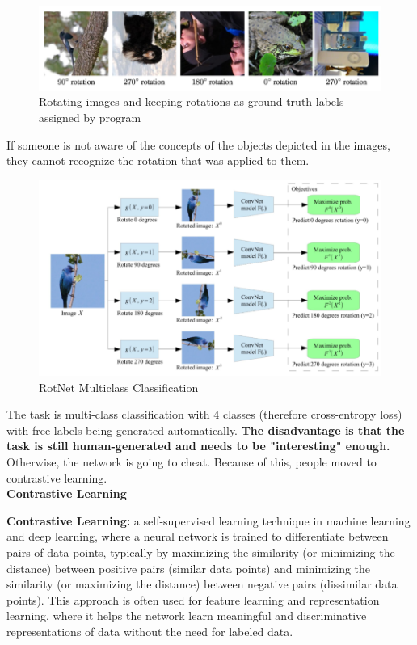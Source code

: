 \begin{figure}[h!t]
    \centering
    \includegraphics[width=0.75\linewidth]{rotnet.png}
    \caption{Rotating images and keeping rotations as ground truth labels assigned by program}
    \label{fig:enter-label}
\end{figure}

If someone is not aware of the concepts of the objects depicted in the images, they
cannot recognize the rotation that was applied to them.

\begin{figure}[h!t]
    \centering
    \includegraphics[width=0.6\linewidth]{rotnetclassification.png}
    \caption{RotNet Multiclass Classification}
    \label{fig:enter-label}
\end{figure}

\newpage

The task is multi-class classification with 4 classes (therefore cross-entropy loss) with free labels being generated automatically. \textbf{The disadvantage is that the task is still human-generated and needs to be "interesting" enough.} Otherwise, the network is going to cheat. Because of this, people moved to contrastive learning.\\

\noindent\textbf{Contrastive Learning}

\begin{definition}
    \textbf{Contrastive Learning:} a self-supervised learning technique in machine learning and deep learning, where a neural network is trained to differentiate between pairs of data points, typically by maximizing the similarity (or minimizing the distance) between positive pairs (similar data points) and minimizing the similarity (or maximizing the distance) between negative pairs (dissimilar data points). This approach is often used for feature learning and representation learning, where it helps the network learn meaningful and discriminative representations of data without the need for labeled data.

\end{definition}


